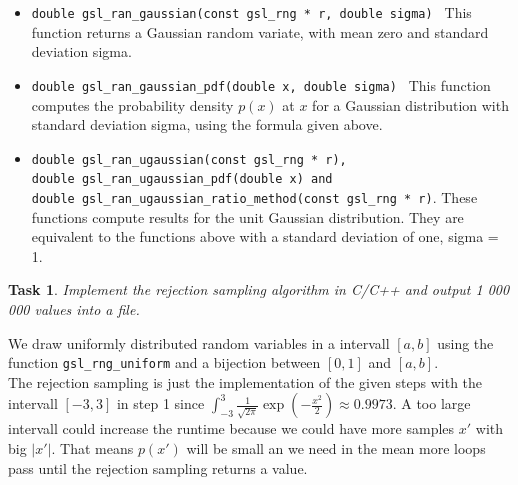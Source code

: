\documentclass{scrartcl}
\newtheorem{task}{Task}
\begin{document}
	\begin{itemize}
		\item \texttt{double gsl\_ran\_gaussian(const gsl\_rng * r, double sigma) } This function returns a 
		Gaussian random variate, with mean zero and standard deviation sigma.
		\item \texttt{double gsl\_ran\_gaussian\_pdf(double x, double sigma) } This function computes the probability density $p(x)$ at $x$ for a Gaussian distribution with standard deviation sigma, 
		using the formula given above.
		\item \texttt{double gsl\_ran\_ugaussian(const gsl\_rng * r),\\
			double gsl\_ran\_ugaussian\_pdf(double x) and \\
			double gsl\_ran\_ugaussian\_ratio\_method(const gsl\_rng * r)}. These functions compute results for the unit Gaussian distribution. They are equivalent to the functions above with a standard deviation of one, sigma = 1.
	\end{itemize}
	
	\begin{task}
		Implement the rejection sampling algorithm in C/C++ and output 1 000 000 values into
		a file.
	\end{task}
	We draw uniformly distributed random variables in a intervall $[a,b]$ using the function \texttt{gsl\_rng\_uniform} and a bijection between $[0,1]$ and $[a,b]$. \\
	The rejection sampling is just the implementation of the given steps with the intervall $[-3,3]$ in step 1 since $\int_{-3}^{3}\frac{1}{\sqrt{2\pi}}\exp\left(-\frac{x^2}{2}\right) \approx 0.9973$. A too large intervall could increase the runtime because we could have more samples $x'$ with big $|x'|$. That means $p(x')$ will be small an we need in the mean more loops pass until the rejection sampling returns a value. 
\end{document}
